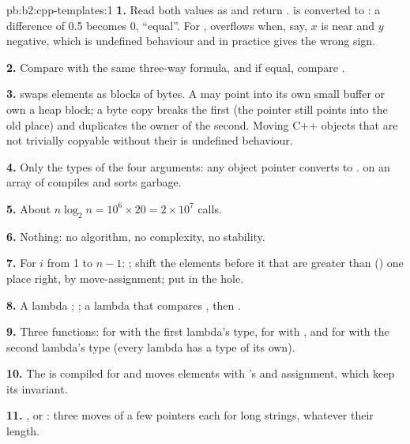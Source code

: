 \begin{solution}{pb:b2:cpp-templates:1}
\textbf{1.} Read both values as  and return .  is converted to
: a difference of 0.5 becomes 0, ``equal''. For ,  overflows when, say, $x$ is near
 and $y$ negative, which is undefined behaviour and in practice gives the wrong sign.

\textbf{2.} Compare  with the same three-way formula, and if equal, compare .

\textbf{3.}  swaps elements as blocks of bytes. A  may point into its own small buffer
or own a heap block; a byte copy breaks the first (the pointer still points into the old place) and duplicates the
owner of the second. Moving C++ objects that are not trivially copyable without their  is undefined
behaviour.

\textbf{4.} Only the types of the four arguments: any object pointer converts to .  on an array of  compiles and sorts garbage.

\textbf{5.} About $n \log_2 n = 10^6 \times 20 = 2 \times 10^7$ calls.

\textbf{6.} Nothing: no algorithm, no complexity, no stability.

\textbf{7.} For $i$ from 1 to $n - 1$: ; shift the elements before it that are greater
than  () one place right, by move-assignment; put  in the hole.

\textbf{8.} A lambda ; ; a lambda that compares ,
then .

\textbf{9.} Three functions:  for  with the first lambda's type, for
 with , and for  with the second lambda's type (every lambda has a
type of its own).

\textbf{10.} The  is compiled for  and moves elements with 's  and assignment, which keep its invariant.

\textbf{11.} , or : three moves
of a few pointers each for long strings, whatever their length.


\end{solution}
